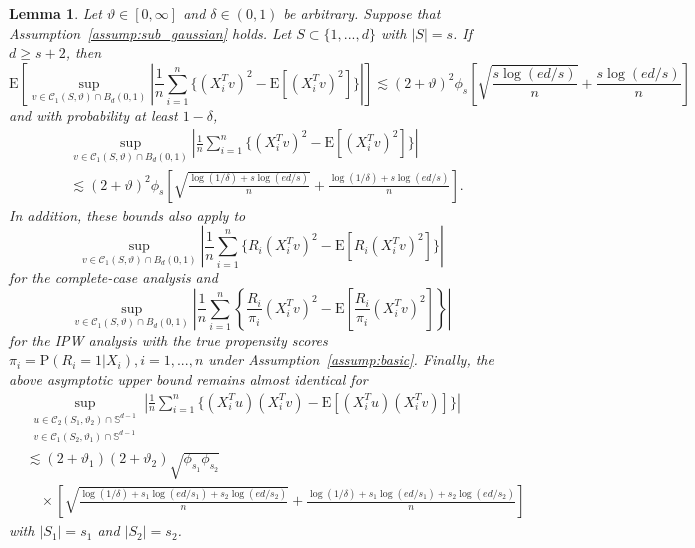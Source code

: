 \documentclass[ejsv2,noshowframe]{imsart}
\theoremstyle{plain}
\newtheorem{lemma}[theorem]{Lemma}
\theoremstyle{definition}
\theoremstyle{remark}
\begin{document}
\vspace{3mm}

\begin{lemma}
	\label{lem:gram_mat_conc}
	Let $\vartheta \in [0,\infty]$ and $\delta \in (0,1)$ be arbitrary. Suppose that Assumption~\ref{assump:sub_gaussian} holds. Let $S\subset \{1,...,d\}$ with $|S|=s$. If $d\geq s+2$, then 
	$$\mathrm{E}\left[\sup_{v\in \mathcal{C}_1(S,\vartheta) \cap B_d(0,1)} \left|\frac{1}{n}\sum_{i=1}^n \Big\{(X_i^T v)^2 - \mathrm{E}\left[(X_i^T v)^2 \right]\Big\}\right|\right] \lesssim (2+\vartheta)^2 \phi_s \left[\sqrt{\frac{s\log(ed/s)}{n}} + \frac{s\log(ed/s)}{n} \right]$$
	and with probability at least $1-\delta$,
	\begin{align*}
		&\sup_{v\in \mathcal{C}_1(S,\vartheta) \cap B_d(0,1)} \left|\frac{1}{n}\sum_{i=1}^n \Big\{(X_i^T v)^2 - \mathrm{E}\left[(X_i^T v)^2 \right]\Big\}\right| \\
		&\lesssim (2+\vartheta)^2 \phi_s \left[\sqrt{\frac{\log(1/\delta) + s\log(ed/s)}{n}} + \frac{\log(1/\delta)  + s\log(ed/s)}{n} \right].
	\end{align*}
	In addition, these bounds also apply to
	$$\sup_{v\in \mathcal{C}_1(S,\vartheta) \cap B_d(0,1)} \left|\frac{1}{n}\sum_{i=1}^n \Big\{R_i(X_i^T v)^2 - \mathrm{E}\left[R_i(X_i^T v)^2 \right]\Big\}\right|$$
	for the complete-case analysis and 
	$$\sup_{v\in \mathcal{C}_1(S,\vartheta) \cap B_d(0,1)} \left|\frac{1}{n}\sum_{i=1}^n \left\{\frac{R_i}{\pi_i}(X_i^T v)^2 - \mathrm{E}\left[\frac{R_i}{\pi_i}(X_i^T v)^2 \right]\right\}\right|$$
	for the IPW analysis with the true propensity scores $\pi_i = \mathrm{P}(R_i=1|X_i), i=1,...,n$ under Assumption~\ref{assump:basic}.
	Finally, the above asymptotic upper bound remains almost identical for 
	\begin{align*}
		&\sup_{\substack{u \in \mathcal{C}_2(S_1,\vartheta_2) \cap \mathbb{S}^{d-1}\\v\in \mathcal{C}_1(S_2,\vartheta_1) \cap \mathbb{S}^{d-1}}} \left|\frac{1}{n}\sum_{i=1}^n \Big\{(X_i^T u)(X_i^T v) - \mathrm{E}\left[(X_i^Tu)(X_i^T v) \right]\Big\}\right|\\
		&\lesssim (2+\vartheta_1) (2+\vartheta_2) \sqrt{\phi_{s_1}\phi_{s_2}}\\
		&\quad \times  \left[\sqrt{\frac{\log(1/\delta) + s_1\log(ed/s_1) + s_2\log(ed/s_2)}{n}} + \frac{\log(1/\delta) + s_1\log(ed/s_1) + s_2\log(ed/s_2)}{n} \right]
	\end{align*}
	with $|S_1|=s_1$ and $|S_2|=s_2$.
\end{lemma}
\end{document}
